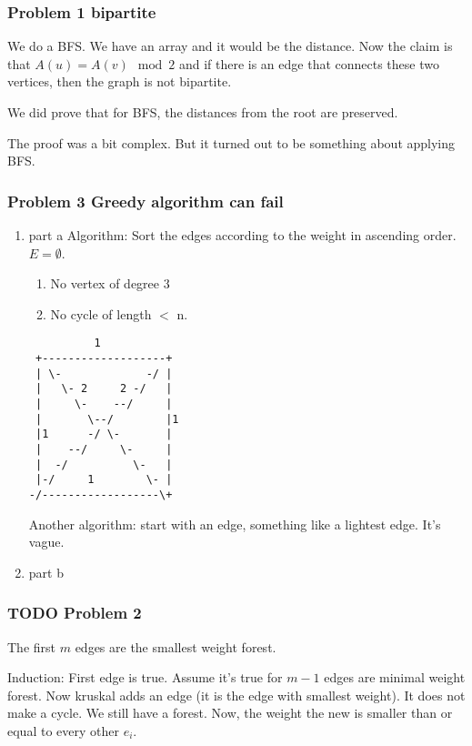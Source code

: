 \documentclass[11pt]{article}
\begin{document}
\subsubsection{Problem 1 bipartite}
\label{sec:org1d4868c}
We do a BFS. We have an array and it would be the distance. Now the claim is
that \(A(u) = A(v) \mod 2\) and if there is an edge that connects these two
vertices, then the graph is not bipartite.

We did prove that for BFS, the distances from the root are preserved.

The proof was a bit complex. But it turned out to be something about
applying BFS.
\subsubsection{Problem 3 Greedy algorithm can fail}
\label{sec:orge719f0c}
\begin{enumerate}
\item part a
\label{sec:org2127abc}
Algorithm: Sort the edges according to the weight in ascending order. \(E =
     \emptyset\). 
\begin{enumerate}
\item No vertex of degree \(3\)
\item No cycle of length \(<\) n.
\end{enumerate}

\begin{verbatim}
          1
 +-------------------+
 | \-             -/ |
 |   \- 2     2 -/   |
 |     \-    --/     |
 |       \--/        |1
 |1      -/ \-       |
 |    --/     \-     |
 |  -/          \-   |
 |-/     1        \- |
-/------------------\+
\end{verbatim}

Another algorithm: start with an edge, something like a lightest edge. It's
vague.


\item part b
\label{sec:org3c6e68d}
\end{enumerate}
\subsubsection{{\bfseries\sffamily TODO} Problem 2}
\label{sec:org0f35330}
The first \(m\) edges are the smallest weight forest.

Induction: First edge is true. Assume it's true for \(m-1\) edges are minimal
weight forest. Now kruskal adds an edge (it is the edge with smallest
weight). It does not make a cycle. We still have a forest. Now, the weight
the new is smaller than or equal to every other \(e_i\). 
\end{document}
